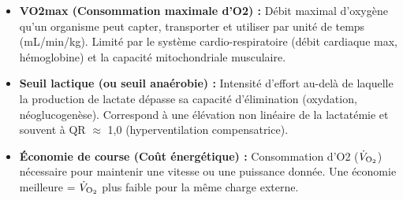 \documentclass[11pt]{article}
\begin{document}
\begin{definition}
    \begin{itemize}
        \item \textbf{VO2max (Consommation maximale d'O2) :} Débit maximal d'oxygène qu'un organisme peut capter, transporter et utiliser par unité de temps (mL/min/kg). Limité par le système cardio-respiratoire (débit cardiaque max, hémoglobine) et la capacité mitochondriale musculaire.
        \item \textbf{Seuil lactique (ou seuil anaérobie) :} Intensité d'effort au-delà de laquelle la production de lactate dépasse sa capacité d'élimination (oxydation, néoglucogenèse). Correspond à une élévation non linéaire de la lactatémie et souvent à QR $\approx$ 1,0 (hyperventilation compensatrice).
        \item \textbf{Économie de course (Coût énergétique) :} Consommation d'O2 ($\dot{V}_{\ce{O2}}$) nécessaire pour maintenir une vitesse ou une puissance donnée. Une économie meilleure = $\dot{V}_{\ce{O2}}$ plus faible pour la même charge externe.
    \end{itemize}
\end{definition}
\end{document}
